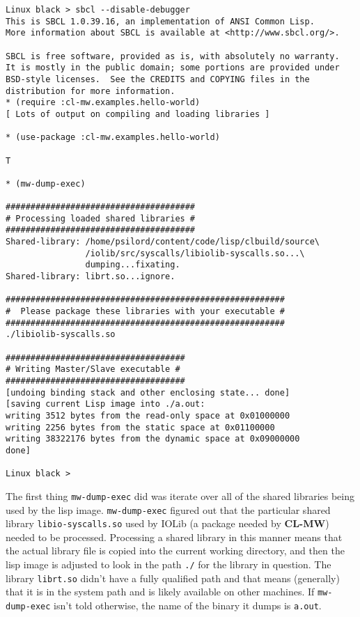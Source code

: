 \documentclass[titlepage,12pt]{book}
\newcommand{\xsmall}{\latexhtml{\small}{}}
\newcommand{\xnormalsize}{\latexhtml{\normalsize}{}}
\newcommand{\clmw}{\xsmall\textbf{CL-MW}\xnormalsize\xspace}
\newcommand{\func}[1]{\xsmall\mbox{\uppercase{\texttt{#1}}}\xnormalsize\xspace}
\newcommand{\file}[1]{\texttt{#1}\xspace}
\begin{document}
\small
\begin{verbatim}
Linux black > sbcl --disable-debugger
This is SBCL 1.0.39.16, an implementation of ANSI Common Lisp.
More information about SBCL is available at <http://www.sbcl.org/>.

SBCL is free software, provided as is, with absolutely no warranty.
It is mostly in the public domain; some portions are provided under
BSD-style licenses.  See the CREDITS and COPYING files in the
distribution for more information.
* (require :cl-mw.examples.hello-world)
[ Lots of output on compiling and loading libraries ]

* (use-package :cl-mw.examples.hello-world)

T

* (mw-dump-exec)

######################################
# Processing loaded shared libraries #
######################################
Shared-library: /home/psilord/content/code/lisp/clbuild/source\
                /iolib/src/syscalls/libiolib-syscalls.so...\
                dumping...fixating.
Shared-library: librt.so...ignore.

########################################################
#  Please package these libraries with your executable #
########################################################
./libiolib-syscalls.so

####################################
# Writing Master/Slave executable #
####################################
[undoing binding stack and other enclosing state... done]
[saving current Lisp image into ./a.out:
writing 3512 bytes from the read-only space at 0x01000000
writing 2256 bytes from the static space at 0x01100000
writing 38322176 bytes from the dynamic space at 0x09000000
done]

Linux black >
\end{verbatim}
\normalsize

The first thing \func{mw-dump-exec} did was iterate over all of the
shared libraries being used by the lisp image. \func{mw-dump-exec}
figured out that the particular shared library \file{libio-syscalls.so}
used by IOLib (a package needed by \clmw) needed to be processed.
Processing a shared library in this manner means that the actual library
file is copied into the current working directory, and then the lisp image
is adjusted to look in the path \file{./} for the library in question.
The library \file{librt.so} didn't have a fully qualified path and that means
(generally) that it is in the system path and is likely available on other
machines. If \func{mw-dump-exec} isn't told otherwise, the name of the binary
it dumps is \file{a.out}.
\end{document}
